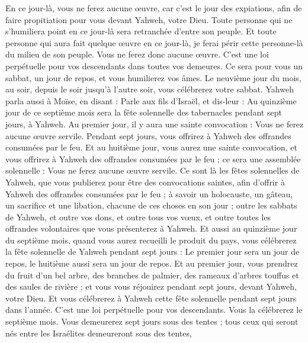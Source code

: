 \begin{multicols}{2}
En ce jour-là, vous ne ferez aucune œuvre, car c'est le jour des expiations, afin de faire propitiation pour vous devant Yahweh, votre Dieu.
Toute personne qui ne s'humiliera point en ce jour-là sera retranchée d'entre son peuple.
Et toute personne qui aura fait quelque œuvre en ce jour-là, je ferai périr cette personne-là du milieu de son peuple.
Vous ne ferez donc aucune œuvre. C'est une loi perpétuelle pour vos descendants dans toutes vos demeures.
Ce sera pour vous un sabbat, un jour de repos, et vous humilierez vos âmes. Le neuvième jour du mois, au soir, depuis le soir jusqu'à l'autre soir, vous célébrerez votre sabbat.
Yahweh parla aussi à Moïse, en disant :
Parle aux fils d'Israël, et dis-leur : Au quinzième jour de ce septième mois sera la fête solennelle des tabernacles pendant sept jours, à Yahweh.
Au premier jour, il y aura une sainte convocation : Vous ne ferez aucune œuvre servile.
Pendant sept jours, vous offrirez à Yahweh des offrandes consumées par le feu. Et au huitième jour, vous aurez une sainte convocation, et vous offrirez à Yahweh des offrandes consumées par le feu ; ce sera une assemblée solennelle : Vous ne ferez aucune œuvre servile.
Ce sont là les fêtes solennelles de Yahweh, que vous publierez pour être des convocations saintes, afin d'offrir à Yahweh des offrandes consumées par le feu ; à savoir un holocauste, un gâteau, un sacrifice et une libation, chacune de ces choses en son jour ;
outre les sabbats de Yahweh, et outre vos dons, et outre tous vos vœux, et outre toutes les offrandes volontaires que vous présenterez à Yahweh.
Et aussi au quinzième jour du septième mois, quand vous aurez recueilli le produit du pays, vous célébrerez la fête solennelle de Yahweh pendant sept jours : Le premier jour sera un jour de repos, le huitième aussi sera un jour de repos.
Et au premier jour, vous prendrez du fruit d'un bel arbre, des branches de palmier, des rameaux d'arbres touffus et des saules de rivière ; et vous vous réjouirez pendant sept jours, devant Yahweh, votre Dieu.
Et vous célébrerez à Yahweh cette fête solennelle pendant sept jours dans l'année. C'est une loi perpétuelle pour vos descendants. Vous la célébrerez le septième mois.
Vous demeurerez sept jours sous des tentes ; tous ceux qui seront nés entre les Israélites demeureront sous des tentes,

\end{multicols}
